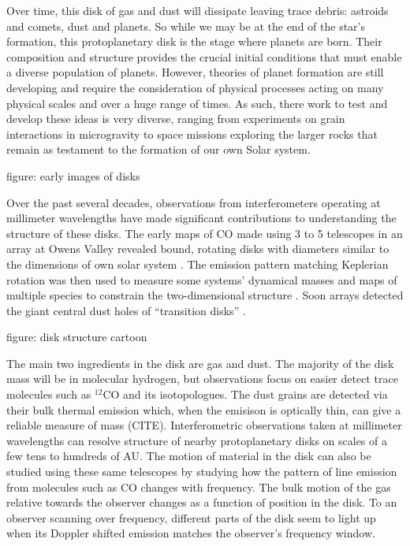 Over time, this disk of gas and dust will dissipate leaving trace debris: astroids and comets, dust and planets.
So while we may be at the end of the star's formation, this protoplanetary disk is the stage where planets are
born.  Their composition and structure provides the crucial initial conditions that must enable a diverse 
population of planets.  However, theories of planet formation are still developing and require the consideration 
of physical processes acting on many physical scales and over a huge range of times.  As such, there 
work to test and develop these ideas is very diverse, ranging from experiments on grain interactions in 
microgravity to space missions exploring the larger rocks that remain as testament to the formation of our 
own Solar system.  

figure: early images of disks

Over the past several decades, observations from interferometers operating at millimeter wavelengths have made
significant contributions to understanding the structure of these disks.  The early maps of CO made using 3 to 5 
telescopes in an array at 
Owens Valley revealed bound, rotating disks with diameters 
similar to the dimensions of own solar system 
\citep{sargent87,weintraub87,weintraub89,sargent91,koerner93,koerner93b,koerner95}.  The emission pattern
matching Keplerian 
rotation was then used to measure some systems' dynamical masses 
\citep{dutrey98,guilloteau98,guilloteau99,simon00} and
maps of multiple species to constrain the two-dimensional structure 
\citep{aikawa99,aikawa01,vanzadelhoff01,aikawa02}.   Soon arrays detected the giant central dust holes of 
``transition disks''
\citep{hughes07,brown09,andrews11}.

figure: disk structure cartoon

The main two ingredients in the disk are gas and dust.  The majority of the disk mass will be in molecular 
hydrogen, but observations focus on easier detect trace molecules such as $^{12}$CO and its isotopologues.
The dust grains are detected via their bulk thermal emission which, when the emisison is optically thin,  
can give a reliable measure of mass (CITE).  Interferometric observations taken at millimeter wavelengths
can resolve structure of nearby protoplanetary disks on scales of a few tens to hundreds of AU.  The motion of 
material in the disk can also be studied using these same telescopes by studying how the pattern of line emission
from molecules such as CO changes with frequency.  The bulk motion of the gas relative towards the observer 
changes as a function of position in the disk. To an observer scanning over frequency, different parts of the 
disk seem to light up when its Doppler shifted emission matches the observer's frequency window.

